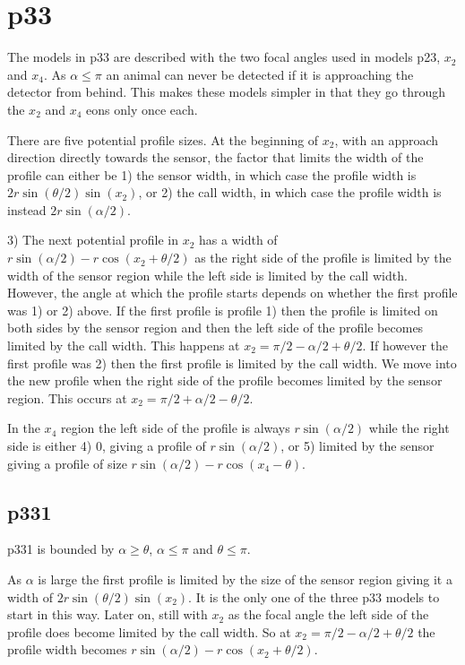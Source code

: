 \section{p33} \label{p33}
 
The models in p33 are described with the two focal angles used in models p23, $x_2$ and $x_4$. As $\alpha \le\pi$ an animal can never be detected if it is approaching the detector from behind. This makes these models simpler in that they go through the $x_2$ and $x_4$ eons only once each. 

There are five potential profile sizes. At the beginning of $x_2$, with an approach direction directly towards the sensor, the factor that limits the width of the profile can either be 1) the sensor width,  in which case the profile width is $2r\sin\left(\theta/2\right)\sin(x_2)$, or 2) the call width, in which case the profile width is instead $2r\sin(\alpha /2)$. 

3) The next potential profile in $x_2$ has a width of $r\sin(\alpha/2) - r\cos(x_2 + \theta/2)$ as the right side of the profile is limited by the width of the sensor region while the left side is limited by the call width. However, the angle at which the profile starts depends on whether the first profile was 1) or 2) above. If the first profile is profile 1) then the profile is limited on both sides by the sensor region and then the left side of the profile becomes limited by the call width. This happens at $x_2 = \pi/2 - \alpha/2 + \theta/2$. If however the first profile was 2) then the first profile is limited by the call width. We move into the new profile when the right side of the profile becomes limited by the sensor region. This occurs at $x_2 = \pi/2 + \alpha/2 - \theta/2$.


In the $x_4$ region the left side of the profile is always $r\sin(\alpha /2)$ while the right side is either 4) 0, giving a profile of $r\sin(\alpha /2)$, or 5) limited by the sensor giving a profile of size $r\sin (\alpha /2) -r\cos(x_4-\theta) $.

\subsection{p331} \label{p331}

p331 is bounded by $\alpha \ge \theta$, $\alpha \le\pi$ and $\theta \le \pi$.

As $\alpha $ is large the first profile is limited by the size of the sensor region giving it a width of $2r\sin\left(\theta/2\right)\sin(x_2)$. It is the only one of the three p33 models to start in this way. Later on, still with $x_2$ as the focal angle the left side of the profile does become limited by the call width. So at $x_2= \pi/2 - \alpha/2 + \theta/2$ the profile width becomes $r\sin(\alpha/2) - r\cos(x_2 + \theta/2)$. 

